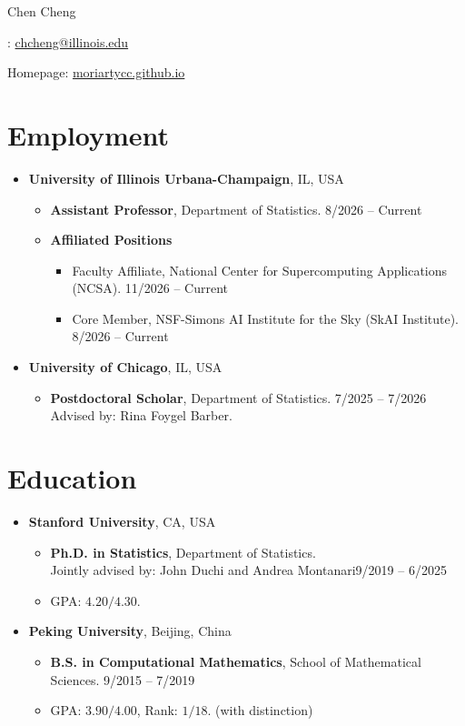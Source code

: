 \documentclass[10pt, a4paper]{article}
\newcommand{\cvdategap}{\hspace{1.5em}\hfill}
\begin{document}
\centerline{\LARGE Chen Cheng}
\centerline{}
\centerline{\Letter: \href{mailto:chcheng@illinois.edu}{chcheng@illinois.edu}}
\centerline{Homepage: \href{https://moriartycc.github.io/}{moriartycc.github.io}}

\section*{\textbf{Employment}}
\begin{itemize}
	\item[] \textbf{University of Illinois Urbana-Champaign}, IL, USA
	\begin{itemize}
		\item [--] \textbf{Assistant Professor}, Department of Statistics. \cvdategap 8/2026 -- Current
		\item [--] \textbf{Affiliated Positions}
		\begin{itemize}
			\setlength{\itemsep}{2pt}
			\item [--] Faculty Affiliate, National Center for Supercomputing Applications (NCSA). \cvdategap 11/2026 -- Current
			\item [--] Core Member, NSF-Simons AI Institute for the Sky (SkAI Institute). \cvdategap 8/2026 -- Current
		\end{itemize}
	\end{itemize}
	\item[] \textbf{University of Chicago}, IL, USA
	\begin{itemize}
		\item [--] \textbf{Postdoctoral Scholar}, Department of Statistics. \cvdategap 7/2025 -- 7/2026 \\[2pt]
		Advised by: Rina Foygel Barber.
	\end{itemize}
\end{itemize}

\section*{\textbf{Education}}
\begin{itemize}
	\item[] \textbf{Stanford University}, CA, USA
	\begin{itemize}
		\item [--] \textbf{Ph.D. in Statistics}, Department of Statistics. \\[2pt]
		Jointly advised by: John Duchi and Andrea Montanari\cvdategap 9/2019 -- 6/2025
		\item [--] GPA: $4.20/4.30$.
	\end{itemize}
	\item[] \textbf{Peking University}, Beijing, China
	\begin{itemize}
		\item [--] \textbf{B.S. in Computational Mathematics}, School of Mathematical Sciences. \cvdategap 9/2015 -- 7/2019
		\item [--] GPA: $3.90/4.00$, Rank: $1/18$. (with distinction)
	\end{itemize}
\end{itemize}
\end{document}
